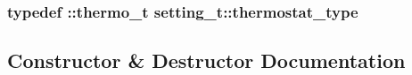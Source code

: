 \subsubsection[{\texorpdfstring{thermostat\+\_\+type}{thermostat_type}}]{\setlength{\rightskip}{0pt plus 5cm}typedef \+::{\bf thermo\+\_\+t} {\bf setting\+\_\+t\+::thermostat\+\_\+type}}\hypertarget{classsetting__t_a3c147644eb31a9319ad4df3b5827777f}{}\label{classsetting__t_a3c147644eb31a9319ad4df3b5827777f}


\subsection{Constructor \& Destructor Documentation}
